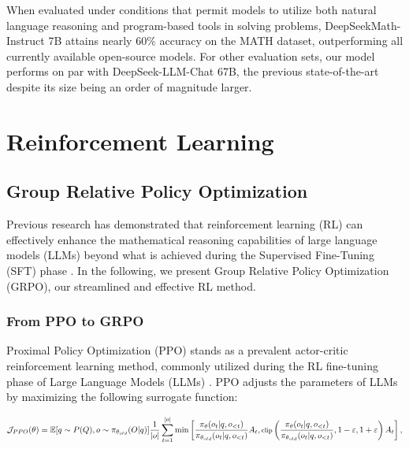 \begin{itemize}[topsep=0pt]
When evaluated under conditions that permit models to utilize both natural language reasoning and program-based tools in solving problems, DeepSeekMath-Instruct 7B attains nearly 60\% accuracy on the MATH dataset, outperforming all currently available open-source models. For other evaluation sets, our model performs on par with DeepSeek-LLM-Chat 67B, the previous state-of-the-art despite its size being an order of magnitude larger.

\section{Reinforcement Learning}

\subsection{Group Relative Policy Optimization} Previous research has demonstrated that reinforcement learning (RL) can effectively enhance the mathematical reasoning capabilities of large language models (LLMs) beyond what is achieved during the Supervised Fine-Tuning (SFT) phase \citep{wang2023math,wizardmath}. In the following, we present Group Relative Policy Optimization (GRPO), our streamlined and effective RL method.

\subsubsection{From PPO to GRPO} Proximal Policy Optimization (PPO) \citep{schulman2017proximal} stands as a prevalent actor-critic reinforcement learning method, commonly utilized during the RL fine-tuning phase of Large Language Models (LLMs) \citep{ouyang2022training}. PPO adjusts the parameters of LLMs by maximizing the following surrogate function:

\begin{equation}
\footnotesize
    \mathcal{J}_{PPO}(\theta) = \mathbb{E}{[q \sim P(Q), o \sim \pi_{\theta_{old}}(O|q)]} \frac{1}{|o|} \sum_{t=1}^{|o|} \min \left[ \frac{\pi_\theta(o_{t} | q, o_{<t})}{\pi_{\theta_{old}}(o_{t} | q, o_{<t})} A_{t}, \text{clip} \left( \frac{\pi_\theta(o_{t} | q, o_{<t})}{\pi_{\theta_{old}}(o_{t} | q, o_{<t})}, 1 - \varepsilon, 1 + \varepsilon \right)  A_{t} \right] ,
\end{equation}


\end{itemize}
